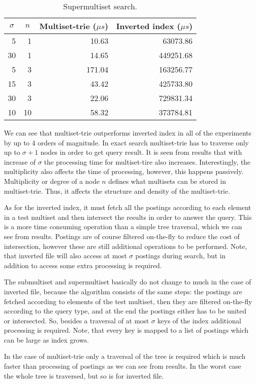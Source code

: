 \begin{table}[h]
\center
\begin{tabular}{|r|r|r|r|}
\hline
\multicolumn{1}{|c|}{$\sigma$} & 
\multicolumn{1}{c|}{$n$} & 
\multicolumn{1}{c|}{Multiset-trie ($\mu s$)} & 
\multicolumn{1}{c|}{Inverted index ($\mu s$)} \\
\hline
5		& 1 		& 10.63 & 63073.86\\
\hline
30	& 1 		& 14.65 & 449251.68\\
\hline
5		& 3 		& 171.04 & 163256.77\\
\hline
15	& 3 		& 43.42 & 425733.80\\
\hline
30	& 3 		& 22.06 & 729831.34\\
\hline
10	& 10 	& 58.32 & 373784.81\\
\hline
\end{tabular}
\caption{Supermultiset search.}
\label{t:res_sup}
\end{table}

We can see that multiset-trie outperforms inverted index in all of the experiments by up to 4 orders of magnitude. 
In exact search multiset-trie has to traverse only up to $\sigma+1$ nodes in order to get query result. It is seen 
from results that with increase of $\sigma$ the processing time for multiset-tire also increases. Interestingly, the 
multiplicity also affects the time of processing, however, this happens passively. Multiplicity or degree of a node $n$ 
defines what multisets can be stored in multiset-trie. Thus, it affects the structure and density of the multiset-trie.

As for the inverted index, it must fetch all the postings according to each element in a test multiset and then intersect 
the results in order to answer the query. This is a more time consuming operation than a simple tree traversal, which we 
can see from results. Postings are of course filtered on-the-fly to reduce the cost of intersection, however these are still 
additional operations to be performed. Note, that inverted file will also access at most $\sigma$ postings during search, 
but in addition to access some extra processing is required.

The submultiset and supermultiset basically do not change to much in the case of inverted file, because the algorithm consists 
of the same steps: the postings are fetched according to elements of the test multiset, then they are filtered on-the-fly 
according to the query type, and at the end the postings either has to be united or intersected. So, besides a traversal of at most 
$\sigma$ keys of the index additional processing is required. Note, that every key is mapped to a list of postings which 
can be large as index grows.

In the case of multiset-trie only a traversal of the tree is required which is much faster than processing of postings as we can 
see from results. In the worst case the whole tree is traversed, but so is for inverted file.
